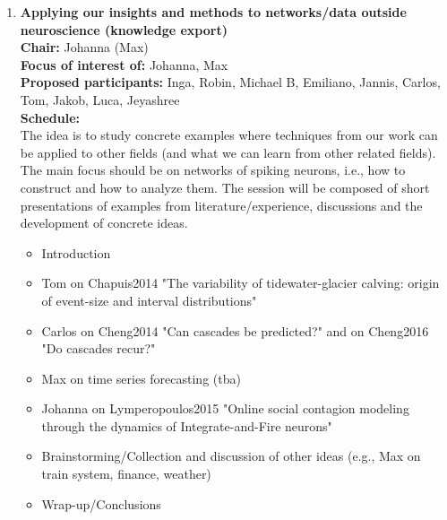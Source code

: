 \documentclass[10pt, a4paper,twoside,american]{article}
\newcommand{\alert}[1]{\textcolor{red}{\bf #1}}
\begin{document}
\begin{enumerate}[resume]
  {\bf Chair:} Rembrandt (Sacha)\\[1ex]
  {\bf Focus of interest of:} Rembrandt, Sacha, (Renato)\\[1ex]
  {\bf Proposed participants:} Sacha, Julia, Lukas, Hannah, Rembrandt, Markus, Fred, (Nicole)\\[1ex]
  {\bf Schedule:} \alert{TBA}\\[1ex]
  Notes:
  \begin{itemize}
  \item folding patterns of ferret cortex in developing brains
  \item features of new connectivity matrix of macaque visual cortex
  \end{itemize}
\item {\large\bf Applying our insights and methods to networks/data outside neuroscience (knowledge export)}\\[1ex]
  {\bf Chair:} Johanna (Max)\\[1ex]
  {\bf Focus of interest of:} Johanna, Max\\[1ex]
  {\bf Proposed participants:} Inga, Robin, Michael B, Emiliano, Jannis, Carlos, Tom, Jakob, Luca, Jeyashree\\[1ex]
  	{\bf Schedule:}\\[1ex]
	The idea is to study concrete examples where techniques from our
	work can be applied to other fields (and what we can learn from other
	related fields). The main focus should be on networks of spiking
	neurons, i.e., how to construct and how to analyze them.  The
	session will be composed of short presentations of examples 		from literature/experience, discussions and the development of concrete ideas.\\	
  	\begin{itemize}
  	\item Introduction
  	\item Tom on Chapuis2014 "The variability of tidewater-glacier calving: origin of event-size and interval distributions"
  	\item Carlos on Cheng2014 "Can cascades be predicted?" and on Cheng2016 "Do cascades recur?"
  	\item Max on time series forecasting (tba)
  	\item Johanna on Lymperopoulos2015 "Online social contagion modeling through the dynamics of Integrate-and-Fire neurons"
  	\item Brainstorming/Collection and discussion of other ideas (e.g., Max on train system, finance, weather)
  	\item Wrap-up/Conclusions
  \end{itemize}
\end{enumerate}
\end{document}
